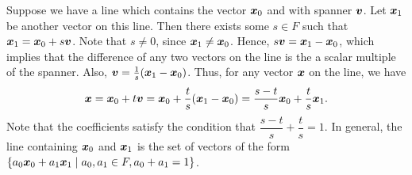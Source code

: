 




Suppose we have a line which contains the vector $\boldsymbol x_0$ and with spanner $\boldsymbol v$. Let $\boldsymbol x_1$ be another vector on this line. Then there exists some $s\in F$ such that $\boldsymbol x_1 = \boldsymbol x_0 + s\boldsymbol v$. Note that $s\neq 0$, since $\boldsymbol x_1\neq \boldsymbol x_0$. Hence, $s\boldsymbol v = \boldsymbol x_1-\boldsymbol x_0$, which implies that the difference of any two vectors on the line is the a scalar multiple of the spanner. Also, $\boldsymbol v = \frac{1}{s}(\boldsymbol x_1 - \boldsymbol x_0)$. Thus, for any vector $\boldsymbol x$ on the line, we have 
\[\boldsymbol x = \boldsymbol x_0 + t\boldsymbol v = \boldsymbol x_0 + \dfrac{t}{s}(\boldsymbol x_1 - \boldsymbol x_0) = \dfrac{s-t}{s}\boldsymbol x_0 + \dfrac{t}{s}\boldsymbol x_1.\] Note that the coefficients satisfy the condition that $\dfrac{s-t}{s} + \dfrac{t}{s} = 1$. In general, the line containing $\boldsymbol x_0$ and $\boldsymbol x_1$ is the set of vectors of the form $\{a_0\boldsymbol x_0 + a_1\boldsymbol x_1\mid a_0, a_1\in F, a_0+a_1=1\}$.\\ 


